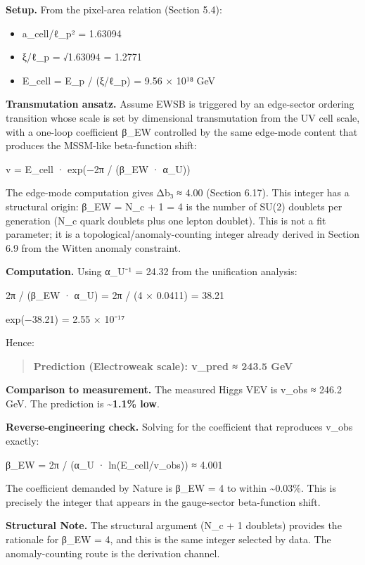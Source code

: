 \textbf{Setup.} From the pixel-area relation (Section 5.4):

\begin{itemize}
\tightlist
\item
  a\_cell/ℓ\_p² = 1.63094
\item
  ξ/ℓ\_p = √1.63094 = 1.2771
\item
  E\_cell = E\_p / (ξ/ℓ\_p) = 9.56 × 10¹⁸ GeV
\end{itemize}

\textbf{Transmutation ansatz.} Assume EWSB is triggered by an edge-sector ordering transition whose scale is set by dimensional transmutation from the UV cell scale, with a one-loop coefficient β\_EW controlled by the same edge-mode content that produces the MSSM-like beta-function shift:

v = E\_cell · exp(−2π / (β\_EW · α\_U))

The edge-mode computation gives Δb₃ ≈ 4.00 (Section 6.17). This integer has a structural origin: β\_EW = N\_c + 1 = 4 is the number of SU(2) doublets per generation (N\_c quark doublets plus one lepton doublet). This is not a fit parameter; it is a topological/anomaly-counting integer already derived in Section 6.9 from the Witten anomaly constraint.

\textbf{Computation.} Using α\_U⁻¹ = 24.32 from the unification analysis:

2π / (β\_EW · α\_U) = 2π / (4 × 0.0411) = 38.21

exp(−38.21) = 2.55 × 10⁻¹⁷

Hence:

\begin{quote}
\textbf{Prediction (Electroweak scale): v\_pred ≈ 243.5 GeV}
\end{quote}

\textbf{Comparison to measurement.} The measured Higgs VEV is v\_obs ≈ 246.2 GeV. The prediction is \textbf{\textasciitilde1.1\% low}.

\textbf{Reverse-engineering check.} Solving for the coefficient that reproduces v\_obs exactly:

β\_EW = 2π / (α\_U · ln(E\_cell/v\_obs)) ≈ 4.001

The coefficient demanded by Nature is β\_EW = 4 to within \textasciitilde0.03\%. This is precisely the integer that appears in the gauge-sector beta-function shift.

\textbf{Structural Note.} The structural argument (N\_c + 1 doublets) provides the rationale for β\_EW = 4, and this is the same integer selected by data. The anomaly-counting route is the derivation channel.

